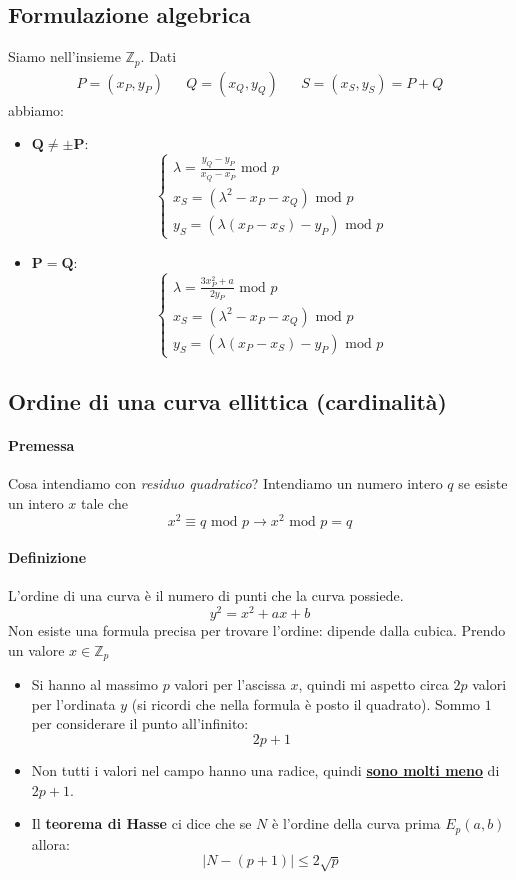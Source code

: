 \subsection{Formulazione algebrica}
Siamo nell'insieme $\mathbb{Z}_p$. Dati \begin{align*}
	P = (x_P, y_P)&&Q = (x_Q, y_Q)&&S = (x_S, y_S) = P+Q
\end{align*}
abbiamo:
\begin{itemize}
	\item $\mathbf{Q \neq \pm P}$:
	\[
	\begin{cases}
		\lambda = \frac{y_Q - y_P}{x_Q - x_P}\text{ mod } p\\
		x_S = (\lambda^{2} - x_P - x_Q)\text{ mod } p \\
		y_S = (\lambda(x_P - x_S) -y_P)\text{ mod } p 
	\end{cases}
	\]
	\item $\mathbf{P = Q}$:
	\[
	\begin{cases}
		\lambda = \frac{3x_P^{2} + a}{2y_P}\text{ mod } p\\
		x_S = (\lambda^{2} - x_P - x_Q)\text{ mod } p \\
		y_S = (\lambda(x_P - x_S)-y_P)\text{ mod } p 
	\end{cases}
	\]
\end{itemize}

\subsection{Ordine di una curva ellittica (cardinalità)}

\paragraph{Premessa} Cosa intendiamo con \emph{residuo quadratico}? Intendiamo un numero intero $q$ se esiste un intero $x$ tale che
$$x^2 \equiv q \text{ mod }p \longrightarrow x^2 \text{ mod } p = q$$

\paragraph{Definizione} L'ordine di una curva è il numero di punti che la curva possiede.
$$y^2=x^2+ax+b$$
Non esiste una formula precisa per trovare l'ordine: dipende dalla cubica. Prendo un valore $x\in \mathbb{Z}_p$
\begin{itemize}
	\item Si hanno al massimo $p$ valori per l'ascissa $x$, quindi mi aspetto circa $2p$ valori per l'ordinata $y$ (si ricordi che nella formula è posto il quadrato). Sommo $1$ per considerare il punto all'infinito:
	$$2p+1$$
	\item Non tutti i valori nel campo hanno una radice, quindi \textbf{\underline{sono molti meno}} di $2p + 1$.
	
	\item Il \textbf{teorema di {Hasse}} ci dice che se $N$ è l'ordine della curva prima $E_p(a,b)$ allora:
	$$ \mid N - (p+1) \mid \leq 2\sqrt{p}  $$
\end{itemize}

